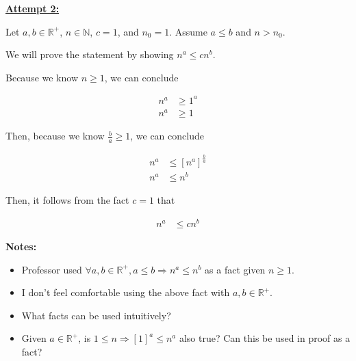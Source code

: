 \documentclass[12pt]{article}
\begin{document}
\begin{enumerate}[a.]
    \bigskip

    \begin{mdframed}
        \underline{\textbf{Attempt 2:}}

        \bigskip

        Let $a,b \in \mathbb{R}^{+}$, $n \in \mathbb{N}$, $c = 1$, and $n_0 = 1$. Assume
        $a \leq b$ and $n > n_0$.

        \bigskip

        We will prove the statement by showing $n^a \leq cn^b$.

        \bigskip
        \color{red}
        Because we know $n \geq 1$, we can conclude

        \setcounter{equation}{0}
        \begin{align}
            n^a &\geq 1^a\\
            n^a &\geq 1
        \end{align}

        \bigskip

        Then, because we know $\frac{b}{a} \geq 1$, we can conclude

        \begin{align}
            n^a &\leq \left[ n^a \right]^{\frac{b}{a}}\\
            n^a &\leq n^b
        \end{align}

        \color{black}

        \bigskip

        Then, it follows from the fact $c = 1$ that

        \begin{align}
            n^a &\leq cn^b
        \end{align}

    \end{mdframed}

    \bigskip

    \textbf{Notes:}

    \begin{itemize}
        \item Professor used $\forall a,b \in \mathbb{R}^{+},
        a \leq b \Rightarrow n^a \leq n^b$ as a fact given $n \geq 1$.
        \item I don't feel comfortable using the above fact with $a,b \in \mathbb{R}^{+}$.
        \item What facts can be used intuitively?
        \item Given $a \in \mathbb{R}^{+}$, is $1 \leq n \Rightarrow [1]^a \leq n^a$
        also true? Can this be used in proof as a fact?


\end{itemize}
\end{enumerate}
\end{document}
